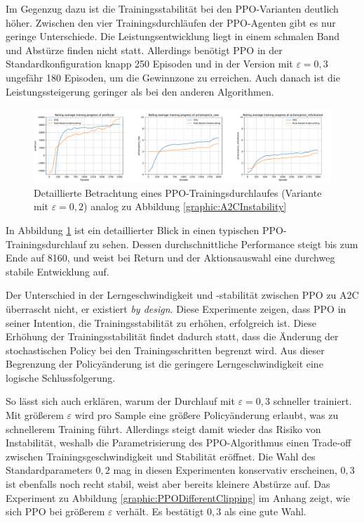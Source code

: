 Im Gegenzug dazu ist die Trainingsstabilität bei den PPO-Varianten deutlich höher.
Zwischen den vier Trainingsdurchläufen der PPO-Agenten gibt es nur geringe Unterschiede.
Die Leistungsentwicklung liegt in einem schmalen Band und Abstürze finden nicht statt.
Allerdings benötigt PPO in der Standardkonfiguration knapp 250 Episoden und in der Version mit $\varepsilon=0{,}3$ ungefähr 180 Episoden, um die Gewinnzone zu erreichen.
Auch danach ist die Leistungssteigerung geringer als bei den anderen Algorithmen.
\begin{figure}[htb]
	\centering
	\includegraphics[width=\textwidth]{main/ppo_detailed_analysis.pdf}
	\caption{Detaillierte Betrachtung eines PPO-Trainingsdurchlaufes (Variante mit $\varepsilon=0{,}2$) analog zu Abbildung \ref{graphic:A2CInstability}}
	\label{graphic:PPOStability}
\end{figure}
In Abbildung \ref{graphic:PPOStability} ist ein detaillierter Blick in einen typischen PPO-Trainingsdurchlauf zu sehen.
Dessen durchschnittliche Performance steigt bis zum Ende auf 8160, und weist bei Return und der Aktionsauswahl eine durchweg stabile Entwicklung auf.

Der Unterschied in der Lerngeschwindigkeit und -stabilität zwischen PPO zu A2C überrascht nicht, er existiert \textit{by design}.
Diese Experimente zeigen, dass PPO in seiner Intention, die Trainingsstabilität zu erhöhen, erfolgreich ist.
Diese Erhöhung der Trainingsstabilität findet dadurch statt, dass die Änderung der stochastischen Policy bei den Trainingsschritten begrenzt wird.
Aus dieser Begrenzung der Policyänderung ist die geringere Lerngeschwindigkeit eine logische Schlussfolgerung.

So lässt sich auch erklären, warum der Durchlauf mit $\varepsilon=0{,}3$ schneller trainiert.
Mit größerem $\varepsilon$ wird pro Sample eine größere Policyänderung erlaubt, was zu schnellerem Training führt.
Allerdings steigt damit wieder das Risiko von Instabilität, weshalb die Parametrisierung des PPO-Algorithmus einen Trade-off zwischen Trainingsgeschwindigkeit und Stabilität eröffnet.
Die Wahl des Standardparameters $0{,}2$ mag in diesen Experimenten konservativ erscheinen, $0{,}3$ ist ebenfalls noch recht stabil, weist aber bereits kleinere Abstürze auf.
Das Experiment zu Abbildung \ref{graphic:PPODifferentClipping} im Anhang zeigt, wie sich PPO bei größerem $\varepsilon$ verhält.
Es bestätigt $0{,}3$ als eine gute Wahl.

